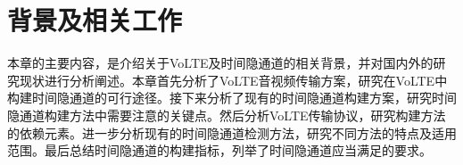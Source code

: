 \chapter{背景及相关工作}
\label{chap:backinfo}

本章的主要内容，是介绍关于VoLTE及时间隐通道的相关背景，并对国内外的研究现状进行分析阐述。本章首先分析了VoLTE音视频传输方案，研究在VoLTE中构建时间隐通道的可行途径。接下来分析了现有的时间隐通道构建方案，研究时间隐通道构建方法中需要注意的关键点。然后分析VoLTE传输协议，研究构建方法的依赖元素。进一步分析现有的时间隐通道检测方法，研究不同方法的特点及适用范围。最后总结时间隐通道的构建指标，列举了时间隐通道应当满足的要求。


